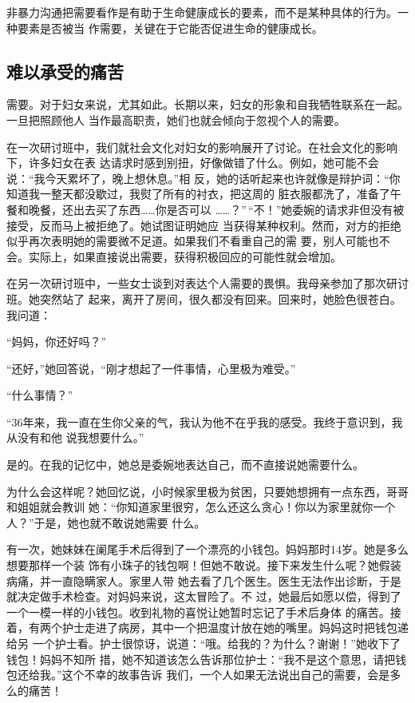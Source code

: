 \documentclass{ctexart}
\renewenvironment{quotation}{\setlength{\parskip}{0.5em}\setstretch{1.5}\kaishu\zihao{-5}\setlength{\parindent}{1em}}{\vspace{1em}}
\begin{document}
非暴力沟通把需要看作是有助于生命健康成长的要素，而不是某种具体的行为。一种要素是否被当
作需要，关键在于它能否促进生命的健康成长。


\subsection{难以承受的痛苦}

需要。对于妇女来说，尤其如此。长期以来，妇女的形象和自我牺牲联系在一起。一旦把照顾他人
当作最高职责，她们也就会倾向于忽视个人的需要。

在一次研讨班中，我们就社会文化对妇女的影响展开了讨论。在社会文化的影响下，许多妇女在表
达请求时感到别扭，好像做错了什么。例如，她可能不会说：``我今天累坏了，晚上想休息。''相
反，她的话听起来也许就像是辩护词：``你知道我一整天都没歇过，我熨了所有的衬衣，把这周的
脏衣服都洗了，准备了午餐和晚餐，还出去买了东西\ldots\ldots 你是否可以
\ldots\ldots？''\,``不！''她委婉的请求非但没有被接受，反而马上被拒绝了。她试图证明她应
当获得某种权利。然而，对方的拒绝似乎再次表明她的需要微不足道。如果我们不看重自己的需
要，别人可能也不会。实际上，如果直接说出需要，获得积极回应的可能性就会增加。

在另一次研讨班中，一些女士谈到对表达个人需要的畏惧。我母亲参加了那次研讨班。她突然站了
起来，离开了房间，很久都没有回来。回来时，她脸色很苍白。我问道：

\begin{quotation}
	``妈妈，你还好吗？''

	``还好，''她回答说，``刚才想起了一件事情，心里极为难受。''

	``什么事情？''

	``36年来，我一直在生你父亲的气，我认为他不在乎我的感受。我终于意识到，我从没有和他
	说我想要什么。''
\end{quotation}

是的。在我的记忆中，她总是委婉地表达自己，而不直接说她需要什么。

为什么会这样呢？她回忆说，小时候家里极为贫困，只要她想拥有一点东西，哥哥和姐姐就会教训
她：``你知道家里很穷，怎么还这么贪心！你以为家里就你一个人？''于是，她也就不敢说她需要
什么。

有一次，她妹妹在阑尾手术后得到了一个漂亮的小钱包。妈妈那时14岁。她是多么想要那样一个装
饰有小珠子的钱包啊！但她不敢说。接下来发生什么呢？她假装病痛，并一直隐瞒家人。家里人带
她去看了几个医生。医生无法作出诊断，于是就决定做手术检查。对妈妈来说，这太冒险了。不
过，她最后如愿以偿，得到了一个一模一样的小钱包。收到礼物的喜悦让她暂时忘记了手术后身体
的痛苦。接着，有两个护士走进了病房，其中一个把温度计放在她的嘴里。妈妈这时把钱包递给另
一个护士看。护士很惊讶，说道：``哦。给我的？为什么？谢谢！''她收下了钱包！妈妈不知所
措，她不知道该怎么告诉那位护士：``我不是这个意思，请把钱包还给我。''这个不幸的故事告诉
我们，一个人如果无法说出自己的需要，会是多么的痛苦！
\end{document}
